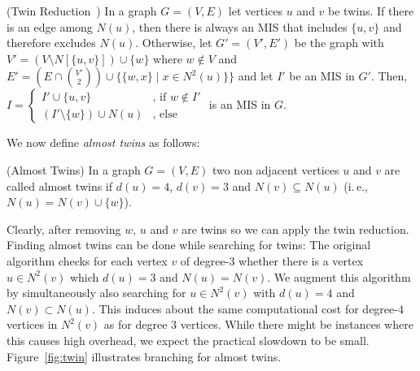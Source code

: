 \documentclass[a4paper,UKenglish,cleveref, autoref, thm-restate]{lipics-v2021}
\newcommand{\ie}{i.\,e.,\xspace}
\begin{document}
\begin{theorem} (Twin Reduction~\cite{XiaoUnconfined}) In a graph $G=(V,E)$ let
  vertices $u$ and $v$ be twins. If there is an edge among $N(u)$, then there is
  always an MIS that includes $\{u,v\}$ and therefore
  excludes $N(u)$. Otherwise, let $G'=(V',E')$ be the graph with $V'=(V\setminus
  N[\{u,v\}])\cup\{w\}$ where $w\notin V$ and $E'=(E\cap\binom{V'}{2})\cup
  \{\{w,x\}\;|\;x\in N^2(u)\}\}$ and let $I'$ be an MIS in $G'$. Then, 
  $
  I=\begin{cases}
    I'\cup \{u,v\} & \text{, if }w\notin I'\\
    (I'\setminus \{w\})\cup N(u) & \text{, else} %
  \end{cases}
  $
  is an MIS in $G$.
\end{theorem}

We now define \emph{almost twins} as follows:
\begin{definition} (Almost Twins)
  In a graph $G=(V,E)$ two non adjacent vertices $u$ and $v$ are called almost twins if $d(u) = 4$, $d(v) = 3$ and $N(v)\subseteq N(u)$ (\ie $N(u) = N(v) \cup \{w\}$). 
\end{definition}

Clearly, after removing $w$, $u$ and $v$ are twins so we can apply the twin
reduction. Finding almost twins can be done while searching for twins: The
original algorithm checks for each vertex $v$ of degree-$3$ whether there is a
vertex $u \in N^2(v)$ which $d(u) = 3$ and $N(u) = N(v)$. We augment this
algorithm by simultaneously also searching for $u \in N^2(v)$ with $d(u) = 4$
and $N(v) \subset N(u)$. This induces about the same computational cost for
degree-$4$ vertices in $N^2(v)$ as for degree $3$ vertices. While there might be
instances where this causes high overhead, we expect the practical slowdown to
be small. Figure~\ref{fig:twin} illustrates branching for almost twins. 
\end{document}
